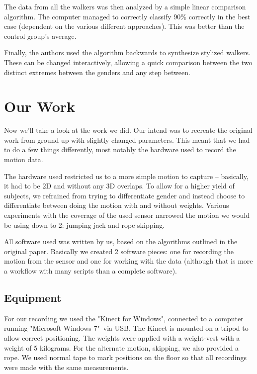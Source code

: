 \documentclass[a4paper]{article}
\begin{document}
The data from all the walkers was then analyzed by a simple linear comparison algorithm.
The computer managed to correctly classify 90\% correctly in the best case (dependent on the various different approaches).
This was better than the control group's average.

Finally, the authors used the algorithm backwards to synthesize stylized walkers.
These can be changed interactively, allowing a quick comparison between the two distinct extremes between the genders and any step between.

\section{Our Work}

Now we'll take a look at the work we did.
Our intend was to recreate the original work from ground up with slightly changed parameters.
This meant that we had to do a few things differently, most notably the hardware used to record the motion data.

The hardware used restricted us to a more simple motion to capture – basically, it had to be 2D and without any 3D overlaps.
To allow for a higher yield of subjects, we refrained from trying to differentiate gender and instead choose to differentiate between doing the motion with and without weights.
Various experiments with the coverage of the used sensor narrowed the motion we would be using down to 2: jumping jack and rope skipping.

All software used was written by us, based on the algorithms outlined in the original paper.
Basically we created 2 software pieces: one for recording the motion from the sensor and one for working with the data (although that is more a workflow with many scripts than a complete software).

\subsection{Equipment}

For our recording we used the "Kinect for Windows"\texttrademark \cite{kinect}, connected to a computer running "Microsoft Windows 7"\textregistered \ via USB.
The Kinect is mounted on a tripod to allow correct positioning.
The weights were applied with a weight-vest with a weight of 5 kilograms.
For the alternate motion, skipping, we also provided a rope.
We used normal tape to mark positions on the floor so that all recordings were made with the same measurements.
\end{document}
